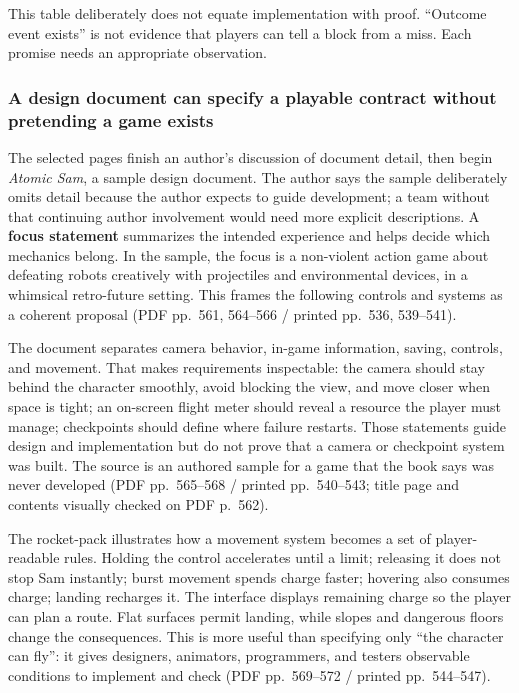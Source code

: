 This table deliberately does not equate implementation with proof. ``Outcome event exists'' is not evidence that players can tell a block from a miss. Each promise needs an appropriate observation.

\subsubsection{A design document can specify a playable contract without pretending a game exists}\label{05-engine-i-ch009-a-design-document-can-specify-a-playable-contract-without-pretending-a-game-exists}

\hypertarget{05-engine-i-ch009-a-design-document-can-specify-a-playable-contract-without-pretending-a-game-exists}{}

The selected pages finish an author's discussion of document detail, then begin \emph{Atomic Sam}, a sample design document. The author says the sample deliberately omits detail because the author expects to guide development; a team without that continuing author involvement would need more explicit descriptions. A \textbf{focus statement} summarizes the intended experience and helps decide which mechanics belong. In the sample, the focus is a non-violent action game about defeating robots creatively with projectiles and environmental devices, in a whimsical retro-future setting. This frames the following controls and systems as a coherent proposal (PDF pp.~561, 564--566 / printed pp.~536, 539--541).

The document separates camera behavior, in-game information, saving, controls, and movement. That makes requirements inspectable: the camera should stay behind the character smoothly, avoid blocking the view, and move closer when space is tight; an on-screen flight meter should reveal a resource the player must manage; checkpoints should define where failure restarts. Those statements guide design and implementation but do not prove that a camera or checkpoint system was built. The source is an authored sample for a game that the book says was never developed (PDF pp.~565--568 / printed pp.~540--543; title page and contents visually checked on PDF p.~562).

The rocket-pack illustrates how a movement system becomes a set of player-readable rules. Holding the control accelerates until a limit; releasing it does not stop Sam instantly; burst movement spends charge faster; hovering also consumes charge; landing recharges it. The interface displays remaining charge so the player can plan a route. Flat surfaces permit landing, while slopes and dangerous floors change the consequences. This is more useful than specifying only ``the character can fly'': it gives designers, animators, programmers, and testers observable conditions to implement and check (PDF pp.~569--572 / printed pp.~544--547).

